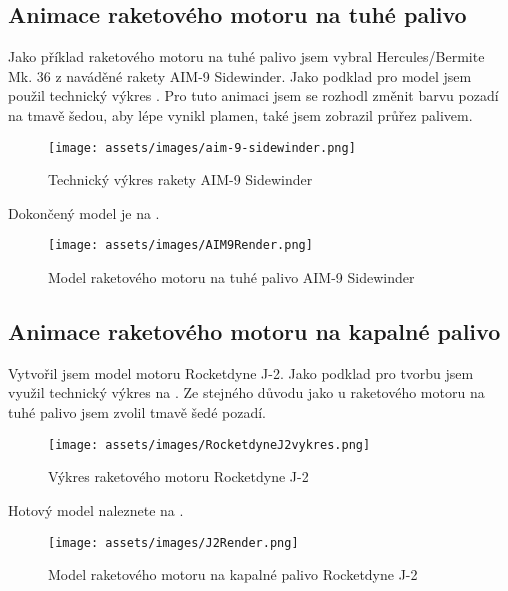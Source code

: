 \subsection{Animace raketového motoru na tuhé palivo}
{Jako příklad raketového motoru na tuhé palivo jsem vybral Hercules/Bermite Mk. 36 z naváděné rakety AIM-9 Sidewinder. Jako podklad pro model jsem použil technický výkres . Pro tuto animaci jsem se rozhodl změnit barvu pozadí na tmavě šedou, aby lépe vynikl plamen, také jsem zobrazil průřez palivem.}
\begin{figure}[H]
    \centering
    \texttt{[image: assets/images/aim-9-sidewinder.png]}
    \caption{Technický výkres rakety AIM-9 Sidewinder \cite{TB:AIM9Sidewinder}}
    \label{obr:AIM9vykres}
\end{figure}
{Dokončený model je na .}
\begin{figure}[H]
    \centering
    \texttt{[image: assets/images/AIM9Render.png]}
    \caption{Model raketového motoru na tuhé palivo AIM-9 Sidewinder \jaObr}
    \label{obr:AIM9Render}
\end{figure}
\newpage
\subsection{Animace raketového motoru na kapalné palivo}
{Vytvořil jsem model motoru Rocketdyne J-2. Jako podklad pro tvorbu jsem využil technický výkres na . Ze stejného důvodu jako u raketového motoru na tuhé palivo jsem zvolil tmavě šedé pozadí.}
\begin{figure}[H]
    \centering
    \texttt{[image: assets/images/RocketdyneJ2vykres.png]}
    \caption{Výkres raketového motoru Rocketdyne J-2 \cite[přeloženo]{HR:F1RocketEngine}}
    \label{obr:J2vykres}
\end{figure}
{Hotový model naleznete na .}
\begin{figure}[H]
    \centering
    \texttt{[image: assets/images/J2Render.png]}
    \caption{Model raketového motoru na kapalné palivo Rocketdyne J-2 \jaObr}
    \label{obr:J2Render}
\end{figure}
\newpage
